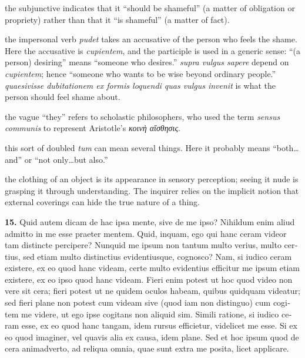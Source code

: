  the subjunctive indicates that it ``should be shameful'' (a matter of obligation or propriety) rather than that it ``is shameful'' (a matter of fact).

 the impersonal verb \textit{pudet} takes an accusative of the person who feels the shame. Here the accusative is \textit{cupientem}, and the participle is used in a generic sense: ``(a person) desiring'' means ``someone who desires.'' \textit{supra vulgus sapere} depend on \textit{cupientem}; hence ``someone who wants to be wise beyond ordinary people.'' \textit{quaesivisse dubitationem ex formis loquendi quas vulgus invenit} is what the person should feel shame about.

 the vague ``they'' refers to scholastic philosophers, who used the term \textit{sensus communis} to represent Aristotle's \textit{κοινὴ αἴσθησις}.

 this sort of doubled \textit{tum} can mean several things. Here it probably means ``both\dots and'' or ``not only\dots but also.''

 the clothing of an object is its appearance in sensory perception; seeing it nude is grasping it through understanding. The inquirer relies on the implicit notion that external coverings can hide the true nature of a thing.

\clearpage

\beginnumbering
\pstart
\begin{latin}
    \textenglish{\textbf{15.}} Quid autem dicam de hac ipsa mente, sive de me ipso? Nihildum enim aliud admitto in me esse praeter mentem. Quid, inquam, ego qui hanc ceram videor tam distincte percipere? Nunquid me ipsum non tantum multo verius, multo certius, sed etiam multo distinctius evidentiusque, cognosco? Nam, si iudico ceram existere, ex eo quod hanc videam, certe multo evidentius efficitur me ipsum etiam existere, ex eo ipso quod hanc videam. Fieri enim potest ut hoc quod video non vere sit cera; fieri potest ut ne quidem oculos habeam, quibus quidquam videatur; sed fieri plane non potest cum videam sive (quod iam non distinguo) cum cogitem me videre, ut ego ipse cogitans non aliquid sim. Simili ratione, si iudico ceram esse, ex eo quod hanc tangam, idem rursus efficietur, videlicet me esse. Si ex eo quod imaginer, vel quavis alia ex causa, idem plane. Sed et hoc ipsum quod de cera animadverto, ad reliqua omnia, quae sunt extra me posita, licet applicare.
\end{latin}
\pend
\endnumbering

